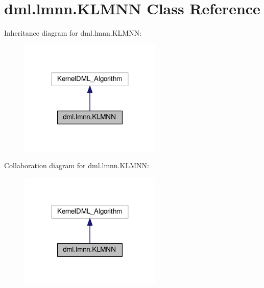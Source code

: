 \hypertarget{classdml_1_1lmnn_1_1KLMNN}{}\section{dml.\+lmnn.\+K\+L\+M\+NN Class Reference}
\label{classdml_1_1lmnn_1_1KLMNN}


Inheritance diagram for dml.\+lmnn.\+K\+L\+M\+NN\+:
\nopagebreak
\begin{figure}[H]
\begin{center}
\leavevmode
\includegraphics[width=192pt]{classdml_1_1lmnn_1_1KLMNN__inherit__graph}
\end{center}
\end{figure}


Collaboration diagram for dml.\+lmnn.\+K\+L\+M\+NN\+:
\nopagebreak
\begin{figure}[H]
\begin{center}
\leavevmode
\includegraphics[width=192pt]{classdml_1_1lmnn_1_1KLMNN__coll__graph}
\end{center}
\end{figure}
